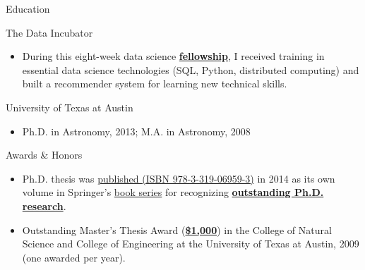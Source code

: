 \documentclass{article}
\newlength{\tabin}
\newlength{\secsep}
\newcommand{\lineunder}{\vspace*{-8pt} \\ \hspace*{-6pt} \hrulefill \\ \vspace*{-15pt}}
\newenvironment{tabbedsection}[1]{
  \begin{list}{}{
      \setlength{\itemsep}{0pt}
      \setlength{\labelsep}{0pt}
      \setlength{\labelwidth}{0pt}
      \setlength{\leftmargin}{\tabin}
      \setlength{\rightmargin}{\tabin}
      \setlength{\listparindent}{0pt}
      \setlength{\parsep}{0pt}
      \setlength{\parskip}{0pt}
      \setlength{\partopsep}{0pt}
      \setlength{\topsep}{#1}
    }
  \item[]
}{\end{list}}
\newenvironment{resume_section}[1]{
  \filbreak
  \vspace{2\secsep}
  \textsc{\large#1}
  \lineunder
  \begin{tabbedsection}{\secsep}
}{\end{tabbedsection}}
\newenvironment{resume_subsection}[2][]{
  \textbf{#2} \hfill {\footnotesize #1} \hspace{2em}
  \begin{tabbedsection}{0.5\secsep}
}{\end{tabbedsection}}
\newenvironment{subitems}{
  \renewcommand{\labelitemi}{-}
  \begin{itemize}
      \setlength{\labelsep}{1em}
}{\end{itemize}}
\begin{document}
\begin{resume_section}{Education}

  \begin{resume_subsection}{The Data Incubator}
      \begin{subitems}
          \item During this eight-week data science \underline{\textbf{fellowship}}, I received training in essential data science technologies (SQL, Python, distributed computing) and built a recommender system for learning new technical skills.
      \end{subitems}
  \end{resume_subsection}

  \begin{resume_subsection}[Austin, TX (2006--2013)]{University of Texas at Austin}
      \begin{subitems}
          \item Ph.D. in Astronomy, 2013; M.A. in Astronomy, 2008
      \end{subitems}
  \end{resume_subsection}

\end{resume_section}

\begin{resume_section}{Awards \& Honors}
\begin{subitems}

\item Ph.D. thesis was 
\href{http://www.springer.com/us/book/9783319069586}{published (ISBN 978-3-319-06959-3)}
in 2014 as its own volume in Springer's \href{http://www.springer.com/series/8790}{book series} for recognizing \underline{\textbf{outstanding Ph.D. research}}. 
\item Outstanding Master's Thesis Award (\underline{\textbf{\$1,000}}) in the College of Natural Science and College of Engineering at the University of Texas at Austin, 2009 (one awarded per year).

\end{subitems}
\end{resume_section}
\end{document}
